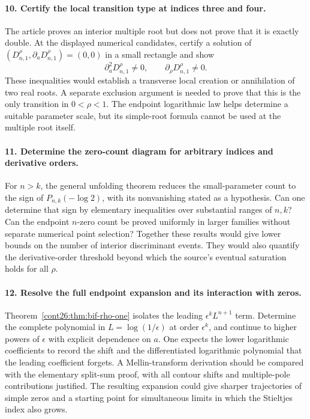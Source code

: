 \documentclass[11pt,letterpaper]{article}
\numberwithin{equation}{section}
\theoremstyle{plain}
\theoremstyle{definition}
\theoremstyle{remark}
\begin{document}
\paragraph{10. Certify the local transition type at indices three and
four.}
The article proves an interior multiple root but does not prove
that it is exactly double. At the displayed numerical candidates,
certify a solution of
$(D_{n,1}^{\rho},\partial_aD_{n,1}^{\rho})=(0,0)$ in a small
rectangle and show
\[
 \partial_a^2D_{n,1}^{\rho}\ne0,\qquad
 \partial_\rho D_{n,1}^{\rho}\ne0.
\]
These inequalities would establish a transverse local creation or
annihilation of two real roots. A separate exclusion argument is
needed to prove that this is the only transition in $0<\rho<1$.
The endpoint logarithmic law helps determine a suitable parameter
scale, but its simple-root formula cannot be used at the multiple
root itself.

\paragraph{11. Determine the zero-count diagram for arbitrary
indices and derivative orders.}
For $n>k$, the general unfolding theorem reduces the small-parameter
count to the sign of $P_{n,k}(-\log2)$, with its nonvanishing stated
as a hypothesis. Can one determine that sign by elementary
inequalities over substantial ranges of $n,k$?
Can the endpoint $n$-zero count be proved uniformly in larger
families without separate numerical point selection?
Together these results would give lower bounds on the number of
interior discriminant events. They would also quantify the
derivative-order threshold beyond which the source's eventual
saturation holds for all $\rho$.

\paragraph{12. Resolve the full endpoint expansion and its interaction
with zeros.}
Theorem~\ref{cont26:thm:bif-rho-one} isolates the leading
$\epsilon^kL^{n+1}$ term. Determine the complete polynomial in
$L=\log(1/\epsilon)$ at order $\epsilon^k$, and continue to
higher powers of $\epsilon$ with explicit dependence on $a$.
One expects the lower logarithmic coefficients to record the
shift and the differentiated logarithmic polynomial that the
leading coefficient forgets. A Mellin-transform derivation should
be compared with the elementary split-sum proof, with all contour
shifts and multiple-pole contributions justified.
The resulting expansion could give sharper trajectories of
simple zeros and a starting point for simultaneous limits in
which the Stieltjes index also grows.
\end{document}
